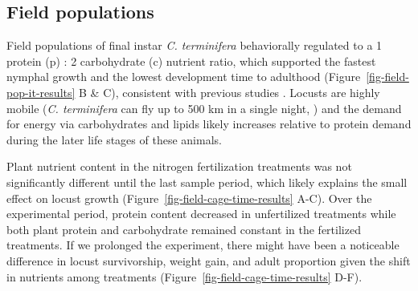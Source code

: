 \documentclass[
]{article}
\begin{document}
\subsection{Field populations}\label{field-populations}

Field populations of final instar \emph{C. terminifera} behaviorally
regulated to a 1 protein (p) : 2 carbohydrate (c) nutrient ratio, which
supported the fastest nymphal growth and the lowest development time to
adulthood (Figure~\ref{fig-field-pop-it-results} B \& C), consistent
with previous studies
\citep{clissold_regulation_2014, lawton_mismatched_2021}. Locusts are
highly mobile (\emph{C. terminifera} can fly up to 500 km in a single
night, \citep{deveson_not_2005}) and the demand for energy via
carbohydrates and lipids likely increases relative to protein demand
during the later life stages of these animals.

Plant nutrient content in the nitrogen fertilization treatments was not
significantly different until the last sample period, which likely
explains the small effect on locust growth
(Figure~\ref{fig-field-cage-time-results} A-C). Over the experimental
period, protein content decreased in unfertilized treatments while both
plant protein and carbohydrate remained constant in the fertilized
treatments. If we prolonged the experiment, there might have been a
noticeable difference in locust survivorship, weight gain, and adult
proportion given the shift in nutrients among treatments
(Figure~\ref{fig-field-cage-time-results} D-F).
\end{document}
